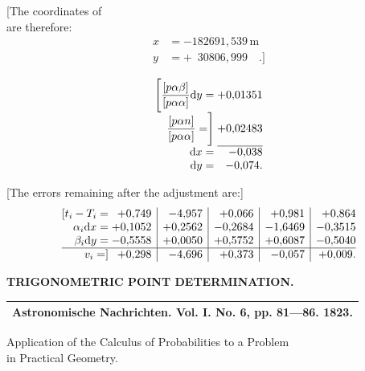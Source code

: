 \noindent
\begin{minipage}[t]{.55\linewidth}
 [The coordinates of \\
 are therefore:
 \[
 \begin{aligned}
  x&=-182691{,}539\,\mathrm{m}\\
  y&=+\phantom{1}30806{,}999\quad .]
 \end{aligned}
 \]
\end{minipage}\hfill
\begin{minipage}[t]{.43\linewidth}
 \[
 \begin{array}{@{}r@{\;}r@{}}
  \Biggl[\dfrac{[p\alpha\beta]}{[p\alpha\alpha]}\mathrm{d}y=&+0{,}01351\\[5pt]
  \dfrac{[p\alpha n]}{[p\alpha\alpha]}=\Biggr]&+0{,}02483\\
  \cline{2-2}
  \mathrm{d}x=&-0{,}038\\
  \mathrm{d}y=&-0{,}074.
 \end{array}
 \]
\end{minipage}\par

[The errors remaining after the adjustment are:]
\[
\begin{array}{@{}r@{\;}r|r|r|r|r@{}}
 [t_i-T_i=&+0{,}749&-4{,}957&+0{,}066&+0{,}981&+0{,}864\\
 \alpha_i\mathrm{d}x=&+0{,}1052&+0{,}2562&-0{,}2684&-1{,}6469&-0{,}3515\\
 \beta_i\mathrm{d}y=&-0{,}5558&+0{,}0050&+0{,}5752&+0{,}6087&-0{,}5040\\
 \hline
 v_i=]&+0{,}298&-4{,}696&+0{,}373&-0{,}057&+0{,}009.
\end{array}
\]

\par\clearpage
\noindent\null\hfill{\small\textbf{TRIGONOMETRIC POINT DETERMINATION.}}\hfill{}\par\medskip

\vspace*{3.6\baselineskip}
{\centering
[6.]\par\medskip
{\footnotesize
\begin{tabular}{c}
\hline
Astronomische Nachrichten. Vol. I. No. 6, pp. 81—86. 1823.\\
\hline
\end{tabular}\par}
\medskip
Application of the Calculus of Probabilities to a Problem\\
in Practical Geometry.\par}
\medskip

